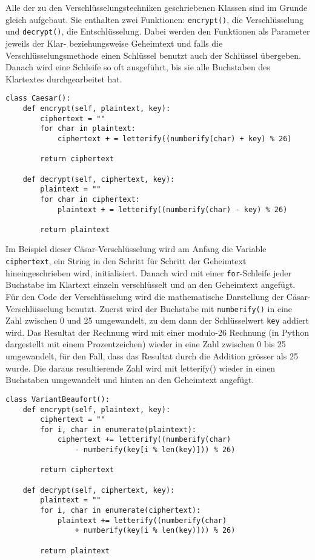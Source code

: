 Alle der zu den Verschlüsselungstechniken geschriebenen Klassen sind im Grunde gleich aufgebaut. Sie enthalten zwei Funktionen: \verb+encrypt()+, die Verschlüsselung und \verb+decrypt()+, die Entschlüsselung. Dabei werden den Funktionen als Parameter jeweils der Klar- beziehungsweise Geheimtext und falls die Verschlüsselungsmethode einen Schlüssel benutzt auch der Schlüssel übergeben. Danach wird eine Schleife so oft ausgeführt, bis sie alle Buchstaben des Klartextes durchgearbeitet hat. 

\begin{Verbatim}
class Caesar():
    def encrypt(self, plaintext, key):
        ciphertext = ""
        for char in plaintext:
            ciphertext + = letterify((numberify(char) + key) % 26)

        return ciphertext

    def decrypt(self, ciphertext, key):
        plaintext = "" 
        for char in ciphertext:
            plaintext + = letterify((numberify(char) - key) % 26)

        return plaintext
\end{Verbatim}

Im Beispiel dieser Cäsar-Verschlüsselung wird am Anfang die Variable \verb+ciphertext+, ein String in den Schritt für Schritt der Geheimtext hineingeschrieben wird, initialisiert. Danach wird mit einer \verb+for+-Schleife jeder Buchstabe im Klartext einzeln verschlüsselt und an den Geheimtext angefügt. Für den Code der Verschlüsselung wird die mathematische Darstellung der Cäsar-Verschlüsselung benutzt. Zuerst wird der Buchstabe mit \verb+numberify()+ in eine Zahl zwischen 0 und 25 umgewandelt, zu dem dann der Schlüsselwert \verb+key+ addiert wird. Das Resultat der Rechnung wird mit einer modulo-26 Rechnung (in Python dargestellt mit einem Prozentzeichen) wieder in eine Zahl zwischen 0 bis 25 umgewandelt, für den Fall, dass das Resultat durch die Addition grösser als 25 wurde. Die daraus resultierende Zahl wird mit letterify() wieder in einen Buchstaben umgewandelt und hinten an den Geheimtext angefügt.


\newpage

\begin{Verbatim}
class VariantBeaufort():
    def encrypt(self, plaintext, key):
        ciphertext = ""
        for i, char in enumerate(plaintext):
            ciphertext += letterify((numberify(char) 
				- numberify(key[i % len(key)])) % 26)
        
        return ciphertext

    def decrypt(self, ciphertext, key):
        plaintext = ""
        for i, char in enumerate(ciphertext):
            plaintext += letterify((numberify(char) 
				+ numberify(key[i % len(key)])) % 26)
        
        return plaintext
\end{Verbatim}

